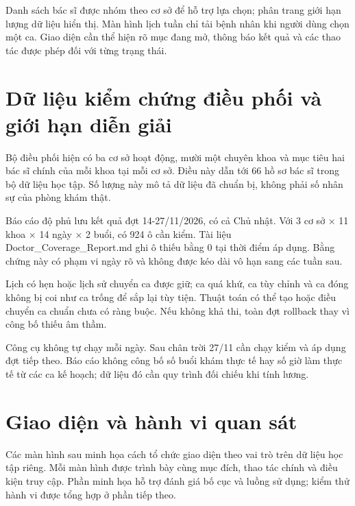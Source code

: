 Danh sách bác sĩ được nhóm theo cơ sở để hỗ trợ lựa chọn; phân trang giới hạn lượng dữ liệu hiển thị.\allowbreak{} Màn hình lịch tuần chỉ tải bệnh nhân khi người dùng chọn một ca.\allowbreak{} Giao diện cần thể hiện rõ mục đang mở, thông báo kết quả và các thao tác được phép đối với từng trạng thái.\allowbreak{}


\section{Dữ liệu kiểm chứng điều phối và giới hạn diễn giải}
Bộ điều phối hiện có ba cơ sở hoạt động, mười một chuyên khoa và mục tiêu hai bác sĩ chính của mỗi khoa tại mỗi cơ sở.\allowbreak{} Điều này dẫn tới 66 hồ sơ bác sĩ trong bộ dữ liệu học tập.\allowbreak{} Số lượng này mô tả dữ liệu đã chuẩn bị, không phải số nhân sự của phòng khám thật.\allowbreak{}

Báo cáo độ phủ lưu kết quả đợt 14-27/\allowbreak{}11/\allowbreak{}2026, có cả Chủ nhật.\allowbreak{} Với 3 cơ sở × 11 khoa × 14 ngày × 2 buổi, có 924 ô cần kiểm.\allowbreak{} Tài liệu Doctor\_\allowbreak{}Coverage\_\allowbreak{}Report.\allowbreak{}md ghi ô thiếu bằng 0 tại thời điểm áp dụng.\allowbreak{} Bằng chứng này có phạm vi ngày rõ và không được kéo dài vô hạn sang các tuần sau.\allowbreak{}

Lịch có hẹn hoặc lịch sử chuyển ca được giữ; ca quá khứ, ca tùy chỉnh và ca đóng không bị coi như ca trống để sắp lại tùy tiện.\allowbreak{} Thuật toán có thể tạo hoặc điều chuyển ca chuẩn chưa có ràng buộc.\allowbreak{} Nếu không khả thi, toàn đợt rollback thay vì công bố thiếu âm thầm.\allowbreak{}

Công cụ không tự chạy mỗi ngày.\allowbreak{} Sau chân trời 27/\allowbreak{}11 cần chạy kiểm và áp dụng đợt tiếp theo.\allowbreak{} Báo cáo không công bố số buổi khám thực tế hay số giờ làm thực tế từ các ca kế hoạch; dữ liệu đó cần quy trình đối chiếu khi tính lương.\allowbreak{}

\clearpage

\section{Giao diện và hành vi quan sát}
Các màn hình sau minh họa cách tổ chức giao diện theo vai trò trên dữ liệu học tập riêng.\allowbreak{} Mỗi màn hình được trình bày cùng mục đích, thao tác chính và điều kiện truy cập.\allowbreak{} Phần minh họa hỗ trợ đánh giá bố cục và luồng sử dụng; kiểm thử hành vi được tổng hợp ở phần tiếp theo.\allowbreak{}

